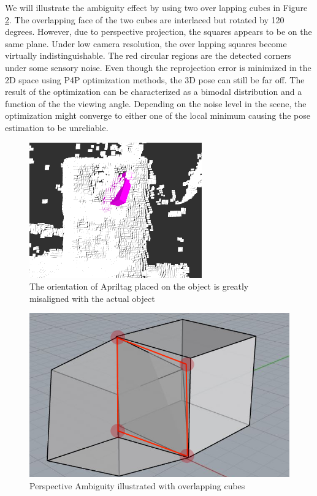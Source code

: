 We will illustrate the ambiguity effect by using two over lapping cubes in Figure \ref{fig:cube}. The overlapping face of the two cubes are interlaced but rotated by 120 degrees. However, due to perspective projection, the squares appears to be on the same plane. Under low camera resolution, the over lapping squares become virtually indistinguishable. The red circular regions are the detected corners under some sensory noise. Even though the reprojection error is minimized in the 2D space using P4P optimization methods, the 3D pose can still be far off. The result of the optimization can be characterized as a bimodal distribution and a function of the the viewing angle. Depending on the noise level in the scene, the optimization might converge to either one of the local minimum causing the pose estimation to be unreliable.
\begin{figure}
\centering
\includegraphics[width=\columnwidth]{figs/mismatch_tag}
\caption{The orientation of Apriltag placed on the object is greatly misaligned with the actual object}
\label{fig:mismatch}
\end{figure}

\begin{figure}
\centering
\includegraphics[width=\columnwidth]{figs/perspective_fig}
\caption{Perspective Ambiguity illustrated with overlapping cubes}
\label{fig:cube}
\end{figure}